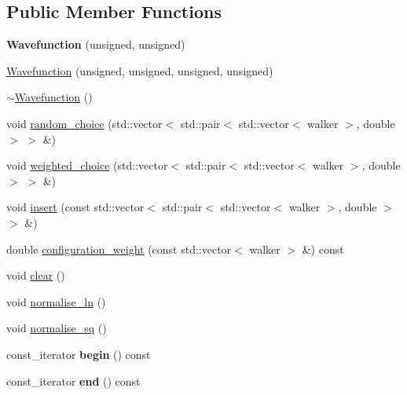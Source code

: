 \subsection*{Public Member Functions}
\begin{DoxyCompactItemize}
\item 
\hypertarget{class_wavefunction_a3a714d647bd12a2517ec001ce3c03b2e}{{\bfseries Wavefunction} (unsigned, unsigned)}\label{class_wavefunction_a3a714d647bd12a2517ec001ce3c03b2e}

\item 
\hyperlink{class_wavefunction_a137b3cd275dd04a461f3f4fe11062809}{Wavefunction} (unsigned, unsigned, unsigned, unsigned)
\item 
\hyperlink{class_wavefunction_aec10cecc3b258442f3f871fff8c00ac2}{$\sim$\+Wavefunction} ()
\item 
void \hyperlink{class_wavefunction_aceb1be3ccbdd127a6d2eee3e8e9e81aa}{random\+\_\+choice} (std\+::vector$<$ std\+::pair$<$ std\+::vector$<$ walker $>$, double $>$ $>$ \&)
\item 
void \hyperlink{class_wavefunction_ae83a43a3f674f171fd469cd4850e5e7a}{weighted\+\_\+choice} (std\+::vector$<$ std\+::pair$<$ std\+::vector$<$ walker $>$, double $>$ $>$ \&)
\item 
void \hyperlink{class_wavefunction_ab9f3f8ac0b6c1343bb1c37dd0d0f2106}{insert} (const std\+::vector$<$ std\+::pair$<$ std\+::vector$<$ walker $>$, double $>$ $>$ \&)
\item 
double \hyperlink{class_wavefunction_af793b1541b937df4e668dd504fbdb18a}{configuration\+\_\+weight} (const std\+::vector$<$ walker $>$ \&) const 
\item 
void \hyperlink{class_wavefunction_afe48f8650867300927b08298736d2545}{clear} ()
\item 
void \hyperlink{class_wavefunction_aa041283ab73a60e6693446e1f45964bb}{normalise\+\_\+ln} ()
\item 
void \hyperlink{class_wavefunction_ae1c1236c133b2d375a969e765787cc7d}{normalise\+\_\+sq} ()
\item 
\hypertarget{class_wavefunction_ac83a68dc42b37228b809171b265b13d3}{const\+\_\+iterator {\bfseries begin} () const }\label{class_wavefunction_ac83a68dc42b37228b809171b265b13d3}

\item 
\hypertarget{class_wavefunction_a151f1b00cfeade0642b04e70298d069b}{const\+\_\+iterator {\bfseries end} () const }\label{class_wavefunction_a151f1b00cfeade0642b04e70298d069b}

\end{DoxyCompactItemize}


